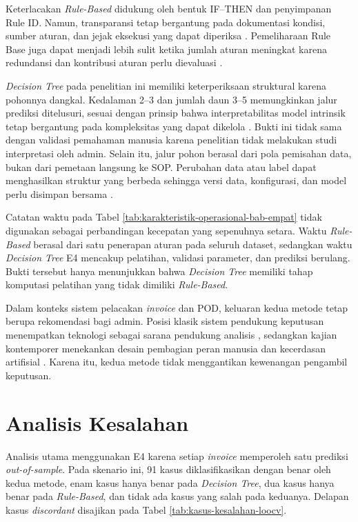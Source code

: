 Keterlacakan \textit{Rule-Based} didukung oleh bentuk IF--THEN dan penyimpanan Rule ID. Namun, transparansi tetap bergantung pada dokumentasi kondisi, sumber aturan, dan jejak eksekusi yang dapat diperiksa \cite{BuchananShortliffe1984,Rudin2019,RudinEtAl2022}. Pemeliharaan Rule Base juga dapat menjadi lebih sulit ketika jumlah aturan meningkat karena redundansi dan kontribusi aturan perlu dievaluasi \cite{BenDavid2008}.

\textit{Decision Tree} pada penelitian ini memiliki keterperiksaan struktural karena pohonnya dangkal. Kedalaman 2--3 dan jumlah daun 3--5 memungkinkan jalur prediksi ditelusuri, sesuai dengan prinsip bahwa interpretabilitas model intrinsik tetap bergantung pada kompleksitas yang dapat dikelola \cite{RudinEtAl2022}. Bukti ini tidak sama dengan validasi pemahaman manusia karena penelitian tidak melakukan studi interpretasi oleh admin. Selain itu, jalur pohon berasal dari pola pemisahan data, bukan dari pemetaan langsung ke SOP. Perubahan data atau label dapat menghasilkan struktur yang berbeda sehingga versi data, konfigurasi, dan model perlu disimpan bersama \cite{JamesEtAl2023}.

Catatan waktu pada Tabel \ref{tab:karakteristik-operasional-bab-empat} tidak digunakan sebagai perbandingan kecepatan yang sepenuhnya setara. Waktu \textit{Rule-Based} berasal dari satu penerapan aturan pada seluruh dataset, sedangkan waktu \textit{Decision Tree} E4 mencakup pelatihan, validasi parameter, dan prediksi berulang. Bukti tersebut hanya menunjukkan bahwa \textit{Decision Tree} memiliki tahap komputasi pelatihan yang tidak dimiliki \textit{Rule-Based}.

Dalam konteks sistem pelacakan \textit{invoice} dan POD, keluaran kedua metode tetap berupa rekomendasi bagi admin. Posisi klasik sistem pendukung keputusan menempatkan teknologi sebagai sarana pendukung analisis \cite{ShimEtAl2002}, sedangkan kajian kontemporer menekankan desain pembagian peran manusia dan kecerdasan artifisial \cite{StoreyEtAl2024}. Karena itu, kedua metode tidak menggantikan kewenangan pengambil keputusan.

\FloatBarrier

\section{Analisis Kesalahan}

Analisis utama menggunakan E4 karena setiap \textit{invoice} memperoleh satu prediksi \textit{out-of-sample}. Pada skenario ini, 91 kasus diklasifikasikan dengan benar oleh kedua metode, enam kasus hanya benar pada \textit{Decision Tree}, dua kasus hanya benar pada \textit{Rule-Based}, dan tidak ada kasus yang salah pada keduanya. Delapan kasus \textit{discordant} disajikan pada Tabel \ref{tab:kasus-kesalahan-loocv}.

